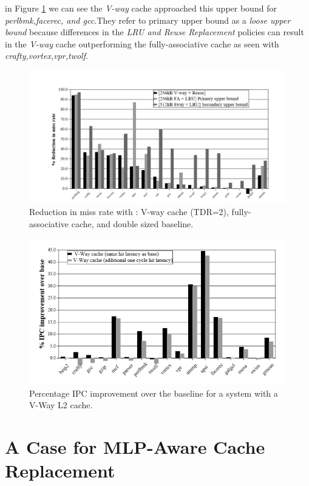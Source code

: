 \documentclass{report}
\begin{document}
in Figure \ref{fig7} we can see the \emph{V-way} cache approached this upper bound for \emph{perlbmk,facerec, and gcc.}They refer to primary upper bound as a \emph{loose upper bound } because differences in the \emph{LRU and Reuse Replacement} policies can result in the\emph{ V-way} cache outperforming the fully-associative cache as seen with \emph{crafty,vortex,vpr,twolf.}

\begin{figure}[t]
\includegraphics[width=1\textwidth]{./fig7}
\caption{Reduction in miss rate with : V-way cache (TDR=2), fully-associative cache, and double sized baseline.}
\label{fig7}
\end{figure}
\begin{figure}[h!]
\includegraphics[width=1\textwidth]{./fig8}
\caption{ Percentage IPC improvement over the baseline for a system with a V-Way L2 cache.}
\label{fig8}
\end{figure}


\chapter{A Case for MLP-Aware Cache Replacement}
\end{document}
